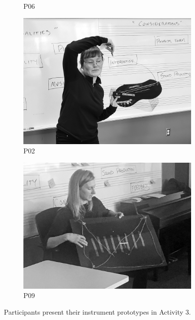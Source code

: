 \documentclass[letterpaper, 12pt]{article}
\begin{document}
\begin{figure}[t]
\begin{subfigure}{0.49\textwidth}
        \caption{P06}
        \label{fig:presentations_P06}
    \end{subfigure}
    \begin{subfigure}{0.49\textwidth}
        \centering
        \includegraphics[width=1\textwidth]{P02.jpg}
        \caption{P02}
        \label{fig:presentations_P02}
    \end{subfigure}
    \begin{subfigure}{0.49\textwidth}
        \centering
        \includegraphics[width=1\textwidth]{P09.jpg}
        \caption{P09}
        \label{fig:presentations_P09}
    \end{subfigure}
    \caption{Participants present their instrument prototypes in Activity 3.}
    \label{fig:presentations}
\end{figure}
\end{document}
